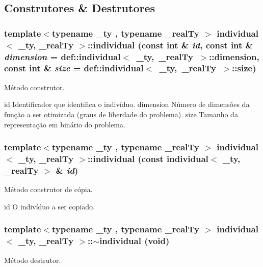 \subsection{Construtores \& Destrutores}
\hypertarget{classindividual_af3455065daf6ab90fdb5c3e6347e453f}{
\subsubsection[{individual}]{\setlength{\rightskip}{0pt plus 5cm}template$<$typename \_\-ty , typename \_\-realTy $>$ {\bf individual}$<$ \_\-ty, \_\-realTy $>$::{\bf individual} (const int \& {\em id}, \/  const int \& {\em dimension} = {\ttfamily def::individual$<$~\_\-ty,~\_\-realTy~$>$::dimension}, \/  const int \& {\em size} = {\ttfamily def::individual$<$~\_\-ty,~\_\-realTy~$>$::size})}}
\label{classindividual_af3455065daf6ab90fdb5c3e6347e453f}
Método construtor.

id Identificador que identifica o indivíduo.  dimension Número de dimensões da função a ser otimizada (graus de liberdade do problema).  size Tamanho da representação em binário do problema. \hypertarget{classindividual_ab73b6268c2159515fc0bd845fbbbb13c}{
\subsubsection[{individual}]{\setlength{\rightskip}{0pt plus 5cm}template$<$typename \_\-ty , typename \_\-realTy $>$ {\bf individual}$<$ \_\-ty, \_\-realTy $>$::{\bf individual} (const {\bf individual}$<$ \_\-ty, \_\-realTy $>$ \& {\em id})}}
\label{classindividual_ab73b6268c2159515fc0bd845fbbbb13c}
Método construtor de cópia.

id O indivíduo a ser copiado. \hypertarget{classindividual_a987acf66924e969f29e3091faf6776b3}{
\subsubsection[{$\sim$individual}]{\setlength{\rightskip}{0pt plus 5cm}template$<$typename \_\-ty , typename \_\-realTy $>$ {\bf individual}$<$ \_\-ty, \_\-realTy $>$::$\sim${\bf individual} (void)}}
\label{classindividual_a987acf66924e969f29e3091faf6776b3}
Método destrutor. 

